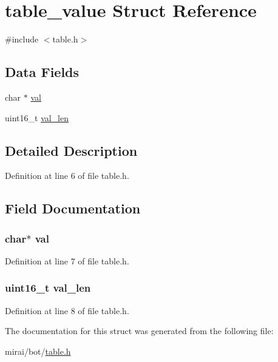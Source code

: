 \hypertarget{structtable__value}{}\section{table\+\_\+value Struct Reference}
\label{structtable__value}


{\ttfamily \#include $<$table.\+h$>$}

\subsection*{Data Fields}
\begin{DoxyCompactItemize}
\item 
char $\ast$ \hyperlink{structtable__value_a1d80a43cb41e5b550d4563dd10d302bc}{val}
\item 
uint16\+\_\+t \hyperlink{structtable__value_ad078959e82badb1a5b5492437adc440f}{val\+\_\+len}
\end{DoxyCompactItemize}


\subsection{Detailed Description}


Definition at line 6 of file table.\+h.



\subsection{Field Documentation}
\subsubsection[{\texorpdfstring{val}{val}}]{\setlength{\rightskip}{0pt plus 5cm}char$\ast$ val}\hypertarget{structtable__value_a1d80a43cb41e5b550d4563dd10d302bc}{}\label{structtable__value_a1d80a43cb41e5b550d4563dd10d302bc}


Definition at line 7 of file table.\+h.

\subsubsection[{\texorpdfstring{val\+\_\+len}{val_len}}]{\setlength{\rightskip}{0pt plus 5cm}uint16\+\_\+t val\+\_\+len}\hypertarget{structtable__value_ad078959e82badb1a5b5492437adc440f}{}\label{structtable__value_ad078959e82badb1a5b5492437adc440f}


Definition at line 8 of file table.\+h.



The documentation for this struct was generated from the following file\+:\begin{DoxyCompactItemize}
\item 
mirai/bot/\hyperlink{table_8h}{table.\+h}\end{DoxyCompactItemize}
